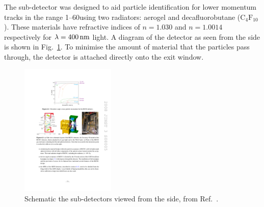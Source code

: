 




\subsubsection{\richone}
The \richone sub-detector was designed to aid particle identification for lower momentum tracks in the range 1--60\gevc using two radiators: aerogel and decafluorobutane ($\text{C}_{4}\text{F}_{10}$). These materials have refractive indices of $n = 1.030$ and $n = 1.0014$ respectively for $\lambda = 400\mathrm{ \,nm}$ light. A diagram of the \richone detector as seen from the side is shown in Fig.~\ref{fig:Dec_richone_layout}. To minimise the amount of material that the particles pass through, the \richone detector is attached directly onto the \velo exit window.  

\begin{figure}[!h]
    \centering        
    \includegraphics[width=0.4\textwidth]{figs/Detector/richone_layout.pdf}
    \caption{Schematic the \richone sub-detectors viewed from the side, from Ref.~\cite{Alves:2008zz}.}
    \label{fig:Dec_richone_layout}   
\end{figure}


